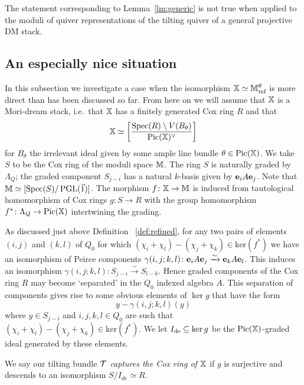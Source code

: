 \documentclass[12pt]{amsart}
\begin{document}
\begin{remark}\label{rm:generic}
The statement corresponding to Lemma~\ref{lm:generic} is not true when applied to the moduli of quiver representations of the tilting quiver of a general projective DM stack.
\end{remark}

\subsection{An especially nice situation}\label{ssec:nice}
In this subsection we investigate a case when the isomorphism $\mathbb{X} \simeq \mathbb{M}_\text{ref}^\theta$ is more direct than has been discussed so far.
From here on we will assume that $\mathbb{X}$ is a Mori-dream stack, i.e.\ that $\mathbb{X}$ has a finitely generated Cox ring $R$ and that $$\mathbb{X} \simeq \bigg[\frac{\operatorname{Spec}(R) \setminus V(B_\theta)}{\operatorname{Pic}(\mathbb{X})^\vee}\bigg]$$ for $B_\theta$ the irrelevant ideal given by some ample line bundle $\theta \in \operatorname{Pic}(\mathbb{X})$.
We take $S$ to be the Cox ring of the moduli space $\mathbb{M}$. The ring $S$ is naturally graded by $\Lambda_Q$; the graded component $S_{j-i}$ has a natural $k$-basis given by $\mathbf{e}_i A \mathbf{e}_j$.
Note that $\mathbb{M} \simeq [\operatorname{Spec}(S)/\operatorname{PGL}(\vec{1})]$. 
The morphism $f \colon \mathbb{X} \rightarrow \mathbb{M}$ is induced from tautological homomorphism of Cox rings $g \colon S \rightarrow R$ with the group homomorphism $f^* \colon \Lambda_Q \rightarrow \operatorname{Pic}(\mathbb{X})$ intertwining the grading.

As discussed just above Definition ~\ref{def:refined}, for any two pairs of elements $(i,j)$ and $(k,l)$ of $Q_0$ for which $(\chi_i + \chi_l)-(\chi_j + \chi_k) \in \text{ker}(f^*)$ we have an isomorphism of Peirce components $\gamma(i,j;k,l) \colon \mathbf{e}_i A \mathbf{e}_j \xrightarrow{\sim} \mathbf{e}_k A \mathbf{e}_l$. 
This induces an isomorphism $\gamma(i,j;k,l) \colon S_{j-i} \xrightarrow{\sim} S_{l-k}$.
Hence graded components of the Cox ring $R$ may become `separated' in the $Q_0$ indexed algebra $A$.
This separation of components gives rise to some obvious elements of $\ker g$ that have the form 
\begin{equation}  \label{eq:deindex}
    y - \gamma(i,j;k,l) (y)
\end{equation}
where $y \in S_{j-i}$ and $i,j,k,l \in Q_0$ are such that $(\chi_i + \chi_l)-(\chi_j + \chi_k) \in \text{ker}(f^*)$. 
We let $I_{\textup{de}}\subseteq \ker g$ be the $\operatorname{Pic}(\mathbb{X})$-graded ideal generated by these elements.

\begin{definition} \label{def:captureCox}
We say our tilting bundle $\mathcal{T}$ {\em captures the Cox ring of $\mathbb{X}$} if $g$ is surjective and descends to an isomorphism $S/I_{de} \simeq R$.
\end{definition}
\end{document}

